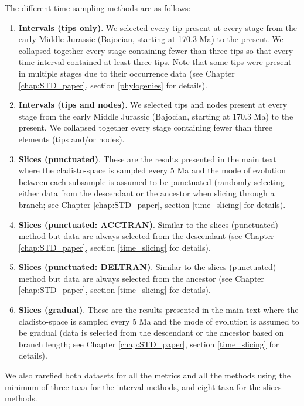 The different time sampling methods are as follows:
\begin{enumerate}
\item \textbf{Intervals (tips only)}.
We selected every tip present at every stage %
from the early Middle Jurassic (Bajocian, starting at 170.3 Ma) to the present.
We collapsed together every stage containing fewer than three tips so that every time interval contained at least three tips.
Note that some tips were present in multiple stages due to their occurrence data (see Chapter \ref{chap:STD_paper}, section \ref{phylogenies} for details).
\item \textbf{Intervals (tips and nodes)}.
We selected tips and nodes present at every stage from the early Middle Jurassic (Bajocian, starting at 170.3 Ma) to the present.
We collapsed together every stage containing fewer than three elements (tips and/or nodes).
\item \textbf{Slices (punctuated)}.
These are the results presented in the main text where the cladisto-space is sampled every 5 Ma and the mode of evolution between each subsample is assumed to be punctuated (randomly selecting either data from the descendant or the ancestor when slicing through a branch; see Chapter \ref{chap:STD_paper}, section \ref{time_slicing} for details).
\item \textbf{Slices (punctuated: ACCTRAN)}.
Similar to the slices (punctuated) method but data are always selected from the descendant (see Chapter \ref{chap:STD_paper}, section \ref{time_slicing} for details).
\item \textbf{Slices (punctuated: DELTRAN)}.
Similar to the slices (punctuated) method but data are always selected from the ancestor (see Chapter \ref{chap:STD_paper}, section \ref{time_slicing} for details).
\item \textbf{Slices (gradual)}.
These are the results presented in the main text where the cladisto-space is sampled every 5 Ma and the mode of evolution is assumed to be gradual (data is selected from the descendant or the ancestor based on branch length; see Chapter \ref{chap:STD_paper}, section \ref{time_slicing} for details).
\end{enumerate}
We also rarefied both datasets for all the metrics and all the methods using the minimum of three taxa for the interval methods, and eight taxa for the slices methods.

